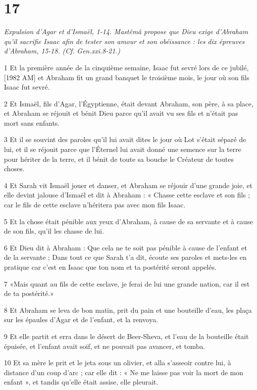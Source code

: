 \chapter{17}

\par \textit{Expulsion d'Agar et d'Ismaël, 1-14. Mastêmâ propose que Dieu exige d'Abraham qu'il sacrifie Isaac afin de tester son amour et son obéissance : les dix épreuves d'Abraham, 15-18. (Cf. Gen.xxi.8-21.)}

\par 1 Et la première année de la cinquième semaine, Isaac fut sevré lors de ce jubilé, [1982 AM] et Abraham fit un grand banquet le troisième mois, le jour où son fils Isaac fut sevré.
\par 2 Et Ismaël, fils d'Agar, l'Égyptienne, était devant Abraham, son père, à sa place, et Abraham se réjouit et bénit Dieu parce qu'il avait vu ses fils et n'était pas mort sans enfants.
\par 3 Et il se souvint des paroles qu'il lui avait dites le jour où Lot s'était séparé de lui, et il se réjouit parce que l'Éternel lui avait donné une semence sur la terre pour hériter de la terre, et il bénit de toute sa bouche le Créateur de toutes choses.
\par 4 Et Sarah vit Ismaël jouer et danser, et Abraham se réjouir d'une grande joie, et elle devint jalouse d'Ismaël et dit à Abraham : « Chasse cette esclave et son fils ; car le fils de cette esclave n'héritera pas avec mon fils Isaac.
\par 5 Et la chose était pénible aux yeux d'Abraham, à cause de sa servante et à cause de son fils, qu'il les chasse de lui.
\par 6 Et Dieu dit à Abraham : Que cela ne te soit pas pénible à cause de l'enfant et de la servante ; Dans tout ce que Sarah t'a dit, écoute ses paroles et mets-les en pratique car c'est en Isaac que ton nom et ta postérité seront appelés.
\par 7 «Mais quant au fils de cette esclave, je ferai de lui une grande nation, car il est de ta postérité.»
\par 8 Et Abraham se leva de bon matin, prit du pain et une bouteille d'eau, les plaça sur les épaules d'Agar et de l'enfant, et la renvoya.
\par 9 Et elle partit et erra dans le désert de Beer-Sheva, et l'eau de la bouteille était épuisée, et l'enfant avait soif, et ne pouvait pas avancer, et tomba.
\par 10 Et sa mère le prit et le jeta sous un olivier, et alla s'asseoir contre lui, à distance d'un coup d'arc ; car elle dit : « Ne me laisse pas voir la mort de mon enfant », et tandis qu'elle était assise, elle pleurait.
